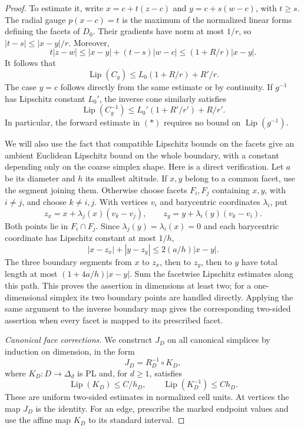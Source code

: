 \documentclass[11pt]{article}
\numberwithin{equation}{section}
\theoremstyle{definition}
\theoremstyle{remark}
\begin{document}
\begin{proof}
To estimate it, write
$x=c+t(z-c)$ and $y=c+s(w-c)$, with $t\geq s$.
The radial gauge $p(x-c)=t$ is the maximum of the normalized
linear forms defining the facets of $D_0$.  Their gradients have
norm at most $1/r$, so $|t-s|\leq |x-y|/r$.  Moreover,
\[
 t|z-w|\leq |x-y|+(t-s)|w-c|
 \leq (1+R/r)|x-y|.
\]
It follows that
\[
 \operatorname{Lip}(C_g)\leq L_0(1+R/r)+R'/r.                 \tag{*}
\]
The case $y=c$ follows directly from the same estimate or by
continuity.  If $g^{-1}$ has Lipschitz constant $L_0'$, the inverse
cone similarly satisfies
\[
 \operatorname{Lip}(C_g^{-1})\leq L_0'(1+R'/r')+R/r'.
\]
In particular, the forward estimate in $(*)$ requires no bound on
$\operatorname{Lip}(g^{-1})$.

We will also use the fact that compatible Lipschitz bounds on the
facets give an ambient Euclidean Lipschitz bound on the whole
boundary, with a constant depending only on the coarse simplex
shape.  Here is a direct verification.  Let $a$ be its diameter and
$h$ its smallest altitude.  If $x,y$ belong to a common facet,
use the segment joining them.  Otherwise choose facets $F_i,F_j$
containing $x,y$, with $i\ne j$, and choose $k\ne i,j$.
With vertices $v_i$ and barycentric coordinates $\lambda_i$, put
\[
 z_x=x+\lambda_j(x)(v_k-v_j),\qquad
 z_y=y+\lambda_i(y)(v_k-v_i).
\]
Both points lie in $F_i\cap F_j$.  Since
$\lambda_j(y)=\lambda_i(x)=0$ and each barycentric coordinate has
Lipschitz constant at most $1/h$,
\[
 |x-z_x|+|y-z_y|\leq 2(a/h)|x-y|.
\]
The three boundary segments from $x$ to $z_x$, then to $z_y$,
then to $y$ have total length at most
$(1+4a/h)|x-y|$.  Sum the facetwise Lipschitz estimates along this
path.  This proves the assertion in dimensions at least two;
for a one-dimensional simplex its two boundary points are handled
directly.  Applying the same argument to the inverse boundary map
gives the corresponding two-sided assertion when every facet is
mapped to its prescribed facet.

\emph{Canonical face corrections.}
We construct $J_D$ on all canonical simplices by induction on
dimension, in the form
\[
 J_D=R_D^{-1}\circ K_D,
\]
where $K_D:D\to\Delta_d$ is PL and, for $d\geq 1$, satisfies
\[
 \operatorname{Lip}(K_D)\leq C/h_D,
 \qquad \operatorname{Lip}(K_D^{-1})\leq C h_D.
\]
These are uniform two-sided estimates in normalized cell units.
At vertices the map $J_D$ is the identity.  For an edge, prescribe
the marked endpoint values and use the affine map $K_D$ to its
standard interval.


\end{proof}
\end{document}
